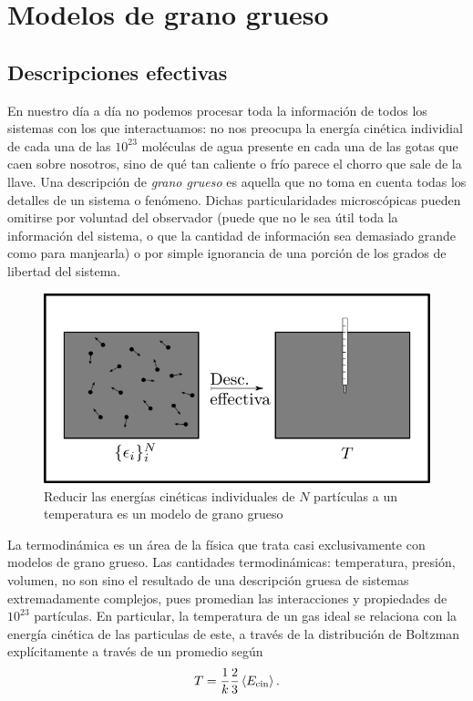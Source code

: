 \section{Modelos de grano grueso}\label{sec:Ch1CG}

\subsection{Descripciones efectivas}

En nuestro día a día no podemos procesar toda la información de todos los sistemas con los que interactuamos: no nos preocupa la energía cinética individial de cada una de las $10^{23}$ moléculas de agua presente en cada una de las gotas que caen sobre nosotros, sino de qué tan caliente o frío parece el chorro que sale de la llave. Una descripción de \textit{grano grueso} es aquella que no toma en cuenta todas los detalles de un sistema o fenómeno. Dichas particularidades microscópicas pueden omitirse por voluntad del observador (puede que no le sea útil toda la información del sistema, o que la cantidad de información sea demasiado grande como para manjearla) o por simple ignorancia de una porción de los grados de libertad del sistema.

\begin{figure}[ht]
    \centering
    \includegraphics[width=0.6\linewidth]{chapter1/figures/CGT.png}
    \caption{Reducir las energías cinéticas individuales de $N$ partículas a un temperatura es un modelo de grano grueso }
    \label{fig:KtoT}
\end{figure}


La termodinámica es un área de la física que trata casi exclusivamente con modelos de grano grueso. Las cantidades termodinámicas: temperatura, presión, volumen, no son sino el resultado de una descripción gruesa de sistemas extremadamente complejos, pues promedian las interacciones y propiedades de $10^{23}$ partículas. En particular, la temperatura de un gas ideal se relaciona con la energía cinética de las particulas de este, a través de la distribución de Boltzman explícitamente a través de un promedio según
\begin{equation}
    T=\frac{1}{k}\frac{2}{3}\expval{E_{\text{cin}}}.
\end{equation}

